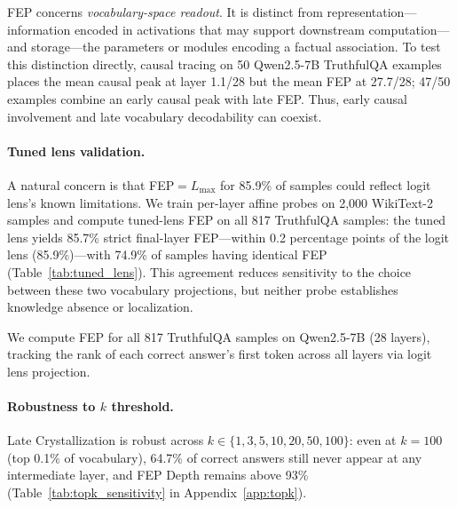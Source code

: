 \documentclass[11pt]{article}
\begin{document}
FEP concerns \emph{vocabulary-space readout}. It is distinct from representation---information encoded in activations that may support downstream computation---and storage---the parameters or modules encoding a factual association. To test this distinction directly, causal tracing on 50 Qwen2.5-7B TruthfulQA examples places the mean causal peak at layer 1.1/28 but the mean FEP at 27.7/28; 47/50 examples combine an early causal peak with late FEP. Thus, early causal involvement and late vocabulary decodability can coexist.

\paragraph{Tuned lens validation.} A natural concern is that FEP${}=L_{\max}$ for 85.9\% of samples could reflect logit lens's known limitations. We train per-layer affine probes on 2{,}000 WikiText-2 samples and compute tuned-lens FEP on all 817 TruthfulQA samples: the tuned lens yields 85.7\% strict final-layer FEP---within 0.2 percentage points of the logit lens (85.9\%)---with 74.9\% of samples having identical FEP (Table~\ref{tab:tuned_lens}). This agreement reduces sensitivity to the choice between these two vocabulary projections, but neither probe establishes knowledge absence or localization.

\begin{table}[t]
\centering\small
{}
\caption{Tuned lens vs.\ logit lens FEP (Qwen2.5-7B, 817 samples). Both yield near-identical late crystallization rates ($\Delta$=0.2\%).}
\label{tab:tuned_lens}
\end{table}

We compute FEP for all 817 TruthfulQA samples on Qwen2.5-7B (28 layers), tracking the rank of each correct answer's first token across all layers via logit lens projection.

\paragraph{Robustness to $k$ threshold.} Late Crystallization is robust across $k \in \{1, 3, 5, 10, 20, 50, 100\}$: even at $k{=}100$ (top 0.1\% of vocabulary), 64.7\% of correct answers still never appear at any intermediate layer, and FEP Depth remains above 93\% (Table~\ref{tab:topk_sensitivity} in Appendix~\ref{app:topk}).
\end{document}
